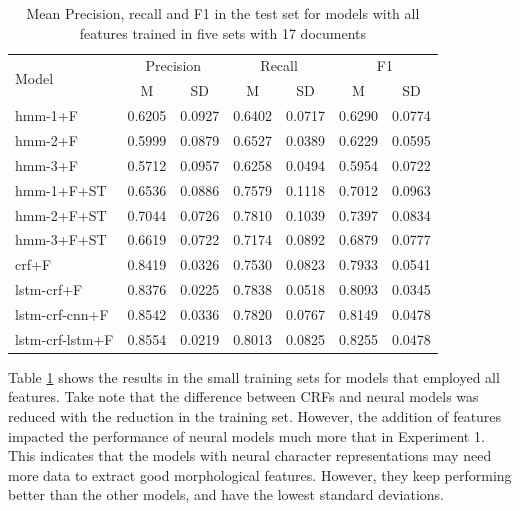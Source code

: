 \documentclass[sigconf]{acmart}
\begin{document}
\begin{table}[h]
  \small
  \begin{center}
    \begin{tabular}{lllllll}
      \toprule
      \multirow{2}{*}{Model} & \multicolumn{2}{c}{Precision} & \multicolumn{2}{c}{Recall} & \multicolumn{2}{c}{F1} \\
                             & \multicolumn{1}{c}{\tiny{M}} & \multicolumn{1}{c}{\tiny{SD}}
			     & \multicolumn{1}{c}{\tiny{M}} & \multicolumn{1}{c}{\tiny{SD}}
			     & \multicolumn{1}{c}{\tiny{M}} & \multicolumn{1}{c}{\tiny{SD}} \\
      \midrule
      hmm-1+F	      & 0.6205 & 0.0927 & 0.6402 & 0.0717 & 0.6290 & 0.0774 \\
      hmm-2+F	      & 0.5999 & 0.0879 & 0.6527 & 0.0389 & 0.6229 & 0.0595 \\
      hmm-3+F	      & 0.5712 & 0.0957 & 0.6258 & 0.0494 & 0.5954 & 0.0722 \\
      hmm-1+F+ST      & 0.6536 & 0.0886 & 0.7579 & 0.1118 & 0.7012 & 0.0963 \\
      hmm-2+F+ST      & 0.7044 & 0.0726 & 0.7810 & 0.1039 & 0.7397 & 0.0834 \\
      hmm-3+F+ST      & 0.6619 & 0.0722 & 0.7174 & 0.0892 & 0.6879 & 0.0777 \\
      crf+F	      & 0.8419 & 0.0326 & 0.7530 & 0.0823 & 0.7933 & 0.0541 \\
      lstm-crf+F      & 0.8376 & 0.0225 & 0.7838 & 0.0518 & 0.8093 & 0.0345 \\
      lstm-crf-cnn+F  & 0.8542 & 0.0336 & 0.7820 & 0.0767 & 0.8149 & 0.0478 \\
      lstm-crf-lstm+F & 0.8554 & 0.0219 & 0.8013 & 0.0825 & 0.8255 & 0.0478 \\
      \bottomrule
    \end{tabular}
  \end{center}
  \caption{Mean Precision, recall and F1 in the test set for models with all features
   trained in five sets with 17 documents}
  \label{tab:experiment2f}
\end{table}

Table \ref{tab:experiment2f} shows the results in the small training sets 
for models that employed all features. Take note that the difference between CRFs
and neural models was reduced with the reduction in the training set. However, the
addition of features impacted the performance of neural models much more that in 
Experiment 1. This indicates that the models with neural character representations
may need more data to extract good morphological features. However, they keep performing 
better than the other models, and have the lowest standard deviations.
\end{document}
